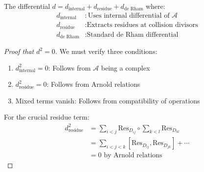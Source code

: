 \begin{theorem}
The differential $d = d_{\text{internal}} + d_{\text{residue}} + d_{\text{de Rham}}$ where:
\begin{align}
d_{\text{internal}} &: \text{Uses internal differential of } \mathcal{A} \\
d_{\text{residue}} &: \text{Extracts residues at collision divisors} \\
d_{\text{de Rham}} &: \text{Standard de Rham differential}
\end{align}
\end{theorem}

\begin{proof}[Proof that $d^2 = 0$]
We must verify three conditions:
\begin{enumerate}
\item $d_{\text{internal}}^2 = 0$: Follows from $\mathcal{A}$ being a complex
\item $d_{\text{residue}}^2 = 0$: Follows from Arnold relations
\item Mixed terms vanish: Follows from compatibility of operations
\end{enumerate}

For the crucial residue term:
\begin{align}
d_{\text{residue}}^2 &= \sum_{i<j} \text{Res}_{D_{ij}} \circ \sum_{k<l} \text{Res}_{D_{kl}} \\
&= \sum_{i<j<k} [\text{Res}_{D_{ij}}, \text{Res}_{D_{jk}}] + \cdots \\
&= 0 \text{ by Arnold relations}
\end{align}
\end{proof}

